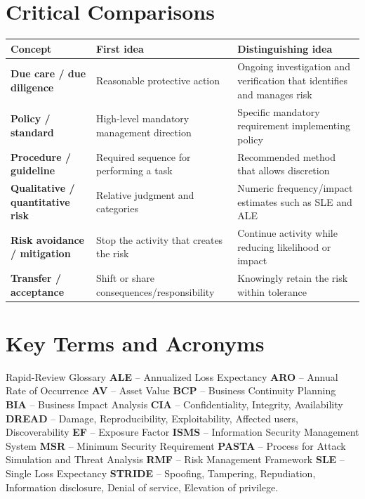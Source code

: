 \documentclass[10pt,letterpaper]{article}
\begin{document}
\section{\color{navy}Critical Comparisons}
\begin{center}
\small
\begin{tabularx}{\textwidth}{>{\bfseries\color{navy}}p{}XX}
\toprule
Concept & First idea & Distinguishing idea\\
\midrule
Due care / due diligence & Reasonable protective action & Ongoing investigation and verification that identifies and manages risk\\
Policy / standard & High-level mandatory management direction & Specific mandatory requirement implementing policy\\
Procedure / guideline & Required sequence for performing a task & Recommended method that allows discretion\\
Qualitative / quantitative risk & Relative judgment and categories & Numeric frequency/impact estimates such as SLE and ALE\\
Risk avoidance / mitigation & Stop the activity that creates the risk & Continue activity while reducing likelihood or impact\\
Transfer / acceptance & Shift or share consequences/responsibility & Knowingly retain the risk within tolerance\\
\bottomrule
\end{tabularx}
\end{center}

\section{\color{navy}Key Terms and Acronyms}
\begin{summarybox}{Rapid-Review Glossary}
\textbf{ALE} -- Annualized Loss Expectancy \quad
\textbf{ARO} -- Annual Rate of Occurrence \quad
\textbf{AV} -- Asset Value \quad
\textbf{BCP} -- Business Continuity Planning \quad
\textbf{BIA} -- Business Impact Analysis \quad
\textbf{CIA} -- Confidentiality, Integrity, Availability \quad
\textbf{DREAD} -- Damage, Reproducibility, Exploitability, Affected users, Discoverability \quad
\textbf{EF} -- Exposure Factor \quad
\textbf{ISMS} -- Information Security Management System \quad
\textbf{MSR} -- Minimum Security Requirement \quad
\textbf{PASTA} -- Process for Attack Simulation and Threat Analysis \quad
\textbf{RMF} -- Risk Management Framework \quad
\textbf{SLE} -- Single Loss Expectancy \quad
\textbf{STRIDE} -- Spoofing, Tampering, Repudiation, Information disclosure, Denial of service, Elevation of privilege.
\end{summarybox}
\end{document}

